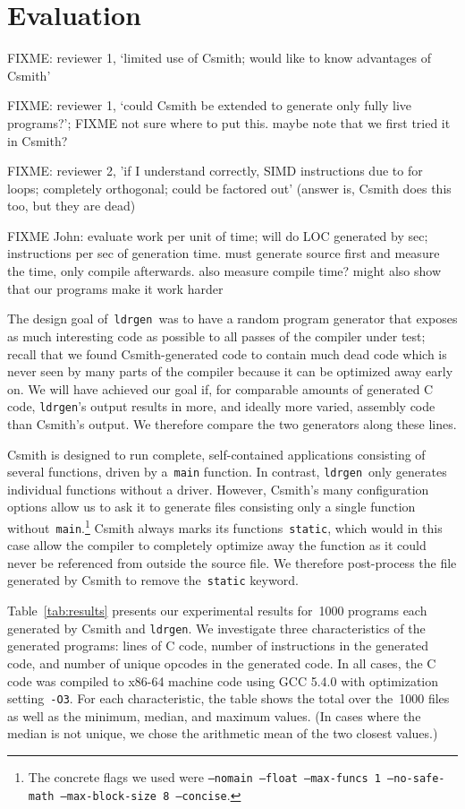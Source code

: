 \documentclass{llncs}
\newcommand\ldrgen{\texttt{ldrgen}}
\begin{document}
\section{Evaluation}
\label{sec:evaluation}

FIXME: reviewer 1, `limited use of Csmith; would like to know advantages of
Csmith'

FIXME: reviewer 1, `could Csmith be extended to generate only fully live
programs?'; FIXME not sure where to put this. maybe note that we first tried
it in Csmith?

FIXME: reviewer 2, 'if I understand correctly, SIMD instructions due to for
loops; completely orthogonal; could be factored out' (answer is, Csmith does
this too, but they are dead)

FIXME John: evaluate work per unit of time; will do LOC generated by sec;
instructions per sec of generation time. must generate source first and
measure the time, only compile afterwards. also measure compile time? might
also show that our programs make it work harder

The design goal of~\ldrgen\ was to have a random program generator that
exposes as much interesting code as possible to all passes of the compiler
under test; recall that we found Csmith-generated code to contain much dead
code which is never seen by many parts of the compiler because it can be
optimized away early on. We will have achieved our goal if, for comparable
amounts of generated C code, \ldrgen's output results in more, and ideally
more varied, assembly code than Csmith's output. We therefore compare the
two generators along these lines.

Csmith is designed to run complete, self-contained applications consisting
of several functions, driven by a~\verb|main| function. In contrast,
\ldrgen\ only generates individual functions without a driver. However,
Csmith's many configuration options allow us to ask it to generate files
consisting only a single function without~\verb|main|.\footnote{The concrete
flags we used were \texttt{--nomain --float --max-funcs 1 --no-safe-math
--max-block-size 8 --concise}.} Csmith always marks its
functions~\verb|static|, which would in this case allow the compiler to
completely optimize away the function as it could never be referenced from
outside the source file. We therefore post-process the file generated by
Csmith to remove the~\verb|static| keyword.

Table~\ref{tab:results} presents our experimental results for~1000 programs
each generated by Csmith and \ldrgen. We investigate three characteristics
of the generated programs: lines of C code, number of instructions in the
generated code, and number of unique opcodes in the generated code. In all
cases, the C code was compiled to x86-64 machine code using GCC 5.4.0 with
optimization setting~\verb|-O3|. For each characteristic, the table shows
the total over the~1000 files as well as the minimum, median, and maximum
values. (In cases where the median is not unique, we chose the arithmetic
mean of the two closest values.)
\end{document}
